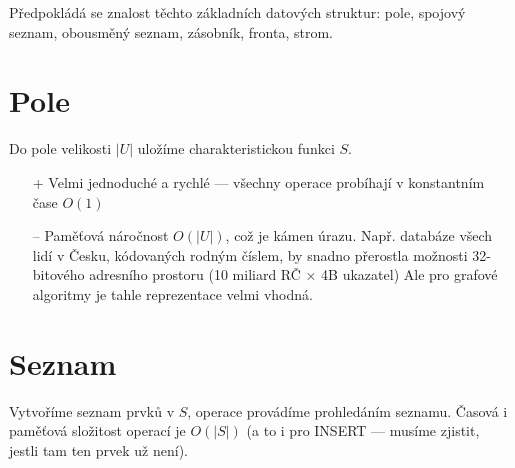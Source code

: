 Předpokládá se znalost těchto základních datových struktur: pole,
spojový seznam, obousměný seznam, zásobník, fronta, strom.

\section{Pole}

Do pole velikosti $|U|$ uložíme charakteristickou funkci $S$.
\begin{itemize}
\item[+] Velmi jednoduché a rychlé --- všechny operace probíhají v
konstantním čase $O(1)$
\item[--] Paměťová náročnost $O(|U|)$, což je kámen
úrazu. Např. databáze všech lidí v Česku, kódovaných rodným číslem, by
snadno přerostla možnosti 32-bitového adresního prostoru (10 miliard
RČ $\times$ 4B ukazatel)  Ale pro grafové
algoritmy je tahle reprezentace velmi vhodná.
\end{itemize}

\section{Seznam}

Vytvoříme seznam prvků v $S$, operace provádíme prohledáním
seznamu. Časová i paměťová složitost operací je $O(|S|)$ (a to i pro
INSERT --- musíme zjistit, jestli tam ten prvek už není).
